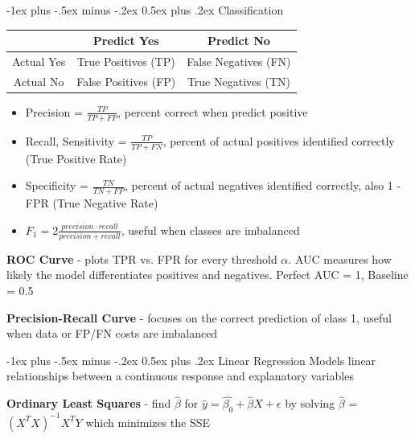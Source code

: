 \documentclass[10pt,landscape]{article}
\makeatletter
\renewcommand{\section}{\@startsection{section}{1}{0mm}%
                                {-1ex plus -.5ex minus -.2ex}%
                                {0.5ex plus .2ex}%
                                {\normalfont\large\bfseries}}
\renewcommand{\subsection}{\@startsection{subsection}{2}{0mm}%
                                {-1ex plus -.5ex minus -.2ex}%
                                {0.5ex plus .2ex}%
                                {\normalfont\normalsize\bfseries}}
\makeatother
\begin{document}
\begin{multicols}{3}
\subsection{Classification}
\begin{center}
        \footnotesize
        \begin{tabular}{ |c|c|c| } 
         \hline
          & Predict Yes & Predict No \\ 
         \hline
         Actual Yes & True Positives (TP) & False Negatives (FN)  \\
         Actual No & False Positives (FP) & True Negatives (TN) \\ 
         \hline
        \end{tabular}
        \end{center}
\vspace{-1mm}
\begin{itemize}[label={--},leftmargin=4mm]
\vspace{-1mm}
\itemsep -.4mm 
\item Precision = $\frac{TP}{TP + FP}$, percent correct when predict positive 
\item Recall, Sensitivity = $\frac{TP}{TP + FN}$, percent of actual positives identified correctly (True Positive Rate)
\item Specificity = $\frac{TN}{TN + FP}$, percent of actual negatives identified correctly, also 1 - FPR (True Negative Rate) 
\item $F_1 = 2\frac{precision\cdot recall}{precision + recall}$, useful when classes are imbalanced
\end{itemize}

\textbf{ROC Curve} - plots TPR vs. FPR for every threshold $\alpha$. AUC measures how likely the model differentiates positives and negatives. Perfect AUC = 1, Baseline = 0.5 

\textbf{Precision-Recall Curve} - focuses on the correct prediction of class 1, useful when data or FP/FN costs are imbalanced

\section{Linear Regression}
Models linear relationships between a continuous response and explanatory variables

\textbf{Ordinary Least Squares} - find $\hat{\beta}$ for $\hat{y} = \hat{\beta_{0}} + \hat{\beta}X + \epsilon$ 
by solving $\hat{\beta}$ = $(X^{T}X)^{-1}X^{T}Y$ which minimizes the SSE 


\end{multicols}
\end{document}
